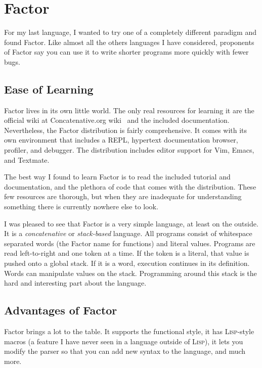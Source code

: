 \documentclass{article}
\begin{document}
\section{Factor}

For my last language, I wanted to try one of a completely different paradigm and
found Factor.  Like almost all the others languages I have considered,
proponents of Factor say you can use it to write shorter programs more quickly
with fewer bugs.

\subsection{Ease of Learning}

Factor lives in its own little world.  The only real resources for learning it
are the official wiki at Concatenative.org wiki~\cite{factorwiki} and the
included documentation.  Nevertheless, the Factor distribution is fairly
comprehensive.  It comes with its own environment that includes a REPL,
hypertext documentation browser, profiler, and debugger.  The distribution
includes editor support for Vim, Emacs, and Textmate.  

The best way I found to learn Factor is to read the included tutorial and
documentation, and the plethora of code that comes with the distribution.  These
few resources are thorough, but when they are inadequate for understanding
something there is currently nowhere else to look.

I was pleased to see that Factor is a very simple language, at least on the
outside.  It is a \emph{concatenative} or \emph{stack-based} language.  All
programs consist of whitespace separated words (the Factor name for functions)
and literal values.  Programs are read left-to-right and one token at a time.
If the token is a literal, that value is pushed onto a global stack.  If it is a
word, execution continues in its definition.  Words can manipulate values on the
stack.  Programming around this stack is the hard and interesting part about the
language.

\subsection{Advantages of Factor}

Factor brings a lot to the table.  It supports the functional style, it has
\textsc{Lisp}-style macros (a feature I have never seen in a language outside of
\textsc{Lisp}), it lets you modify the parser so that you can add new syntax to
the language, and much more.
\end{document}
